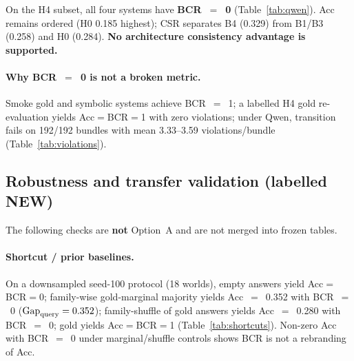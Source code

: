 On the H4 subset, all four systems have \textbf{BCR~$=$~0} (Table~\ref{tab:qwen}). Acc remains ordered (H0 0.185 highest); CSR separates B4 (0.329) from B1/B3 (0.258) and H0 (0.284). \textbf{No architecture consistency advantage is supported.}

\begin{table}[t]
\centering
\caption{\textbf{Frozen Option~A.} Qwen H4 (18 worlds, 192 bundles). All BCR~$=$~0. CSR brackets: world-level bootstrap 95\% CIs.}
\label{tab:qwen}
\small
{}
\end{table}

\paragraph{Why BCR~$=$~0 is not a broken metric.} Smoke gold and symbolic systems achieve BCR~$=$~1; a labelled H4 gold re-evaluation yields Acc$=$BCR$=$1 with zero violations; under Qwen, transition fails on 192/192 bundles with mean 3.33--3.59 violations/bundle (Table~\ref{tab:violations}).

\subsection{Robustness and transfer validation (labelled NEW)}
\label{sec:robustness}

The following checks are \textbf{not} Option~A and are not merged into frozen tables.

\paragraph{Shortcut / prior baselines.} On a downsampled seed-100 protocol (18 worlds), empty answers yield Acc$=$BCR$=$0; family-wise gold-marginal majority yields Acc~$=$~0.352 with BCR~$=$~0 ($\mathrm{Gap}_{\mathrm{query}}=0.352$); family-shuffle of gold answers yields Acc~$=$~0.280 with BCR~$=$~0; gold yields Acc$=$BCR$=$1 (Table~\ref{tab:shortcuts}). Non-zero Acc with BCR~$=$~0 under marginal/shuffle controls shows BCR is not a rebranding of Acc.

